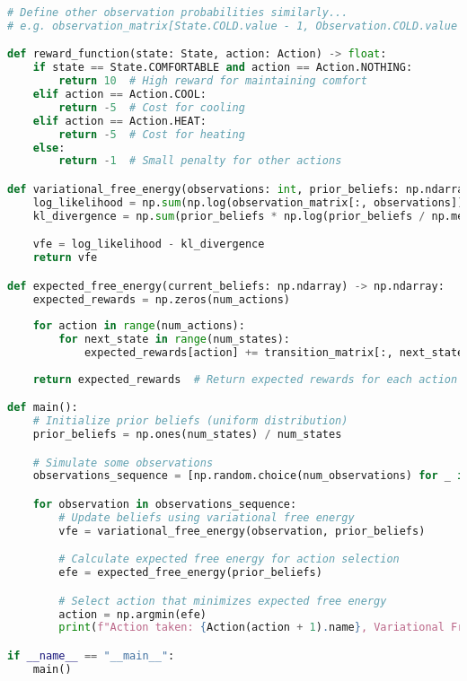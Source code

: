 \documentclass[11pt,a4paper]{article}
\begin{document}
\begin{lstlisting}[language=Python, caption={Full implementation code}]
# Define other observation probabilities similarly...
# e.g. observation_matrix[State.COLD.value - 1, Observation.COLD.value - 1] = 0.8

def reward_function(state: State, action: Action) -> float:
    if state == State.COMFORTABLE and action == Action.NOTHING:
        return 10  # High reward for maintaining comfort
    elif action == Action.COOL:
        return -5  # Cost for cooling
    elif action == Action.HEAT:
        return -5  # Cost for heating
    else:
        return -1  # Small penalty for other actions

def variational_free_energy(observations: int, prior_beliefs: np.ndarray) -> float:
    log_likelihood = np.sum(np.log(observation_matrix[:, observations]))
    kl_divergence = np.sum(prior_beliefs * np.log(prior_beliefs / np.mean(prior_beliefs)))

    vfe = log_likelihood - kl_divergence
    return vfe

def expected_free_energy(current_beliefs: np.ndarray) -> np.ndarray:
    expected_rewards = np.zeros(num_actions)
    
    for action in range(num_actions):
        for next_state in range(num_states):
            expected_rewards[action] += transition_matrix[:, next_state, action] * reward_function(State(next_state + 1), Action(action + 1))
    
    return expected_rewards  # Return expected rewards for each action

def main():
    # Initialize prior beliefs (uniform distribution)
    prior_beliefs = np.ones(num_states) / num_states

    # Simulate some observations
    observations_sequence = [np.random.choice(num_observations) for _ in range(10)]

    for observation in observations_sequence:
        # Update beliefs using variational free energy
        vfe = variational_free_energy(observation, prior_beliefs)

        # Calculate expected free energy for action selection
        efe = expected_free_energy(prior_beliefs)

        # Select action that minimizes expected free energy
        action = np.argmin(efe)
        print(f"Action taken: {Action(action + 1).name}, Variational Free Energy: {vfe:.2f}, Expected Free Energy: {efe[action]:.2f}")

if __name__ == "__main__":
    main()
\end{lstlisting}
\end{document}
